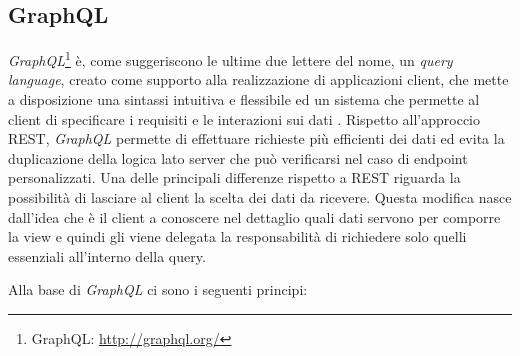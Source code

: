\begin{table}[ht]
	\caption{Esempio RESTful API}
	\label{table:esempio-rest-api}
	\noindent{}
\end{table}

\subsection{GraphQL\label{sec:graphql-introduzione}}

\emph{GraphQL}\footnote{GraphQL: \url{http://graphql.org/}} è, come suggeriscono le ultime due lettere del nome, un \emph{query language}, creato come supporto alla realizzazione di applicazioni client, che mette a disposizione una sintassi intuitiva e flessibile ed un sistema che permette al client di specificare i requisiti e le interazioni sui dati \cite{website:graphql-specs}. Rispetto all'approccio REST, \emph{GraphQL} permette di effettuare richieste più efficienti dei dati ed evita la duplicazione della logica lato server che può verificarsi nel caso di endpoint personalizzati. Una delle principali differenze rispetto a REST riguarda la possibilità di lasciare al client la scelta dei dati da ricevere. Questa modifica nasce dall'idea che è il client a conoscere nel dettaglio quali dati servono per comporre la view e quindi gli viene delegata la responsabilità di richiedere solo quelli essenziali all'interno della query.

Alla base di \emph{GraphQL} ci sono i seguenti principi:

